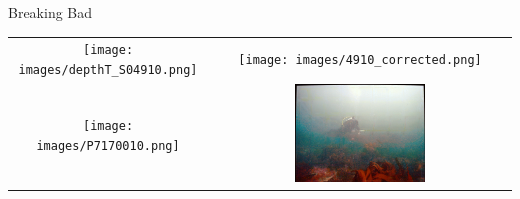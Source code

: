 \begin{frame}{Breaking Bad}
    \centering
    \begin{tabular}{cc}
        \texttt{[image: images/depthT\_S04910.png]} &
        \texttt{[image: images/4910\_corrected.png]} \\
        \texttt{[image: images/P7170010.png]} &
        \includegraphics[width=0.45\textwidth]{images/P7170010_corrected.JPG} \\
    \end{tabular}
\end{frame}

